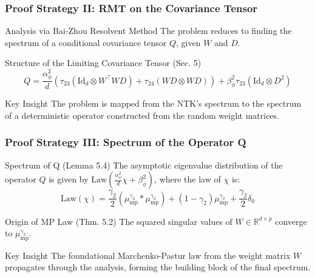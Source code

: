 \documentclass[10pt]{beamer}
\begin{document}
\begin{frame}
    \frametitle{Proof Strategy II: RMT on the Covariance Tensor}
    \begin{block}{Analysis via Bai-Zhou Resolvent Method}
    The problem reduces to finding the spectrum of a conditional covariance tensor $Q$, given $W$ and $D$.
    \end{block}
    \begin{exampleblock}{Structure of the Limiting Covariance Tensor (Sec. 5)}
        \begin{equation*}
            Q = \frac{\alpha_\phi^2}{d} \left( \tau_{23}(\text{Id}_d \otimes W^\top W D) + \tau_{24}(WD \otimes WD) \right) + \beta_\phi^2 \tau_{23}(\text{Id}_d \otimes D^2)
        \end{equation*}
    \end{exampleblock}
    \begin{alertblock}{Key Insight}
    The problem is mapped from the NTK's spectrum to the spectrum of a deterministic operator constructed from the random weight matrices.
    \end{alertblock}
\end{frame}

\begin{frame}
    \frametitle{Proof Strategy III: Spectrum of the Operator Q}
    \begin{block}{Spectrum of Q (Lemma 5.4)}
        The asymptotic eigenvalue distribution of the operator $Q$ is given by $\text{Law}(\frac{\alpha_\phi^2}{d}\chi + \beta_\phi^2)$, where the law of $\chi$ is:
        \begin{equation*}
            \text{Law}(\chi) = \frac{\gamma_2}{2}(\mu_{\text{mp}}^{\gamma_2} * \mu_{\text{mp}}^{\gamma_2}) + (1-\gamma_2)\mu_{\text{mp}}^{\gamma_2} + \frac{\gamma_2}{2}\delta_0
        \end{equation*}
    \end{block}
    \begin{exampleblock}{Origin of MP Law (Thm. 5.2)}
    The squared singular values of $W \in \mathbb{R}^{d \times p}$ converge to $\mu_{\text{mp}}^{\gamma_2}$.
    \end{exampleblock}
    \begin{alertblock}{Key Insight}
    The foundational Marchenko-Pastur law from the weight matrix $W$ propagates through the analysis, forming the building block of the final spectrum.
    \end{alertblock}
\end{frame}
\end{document}
